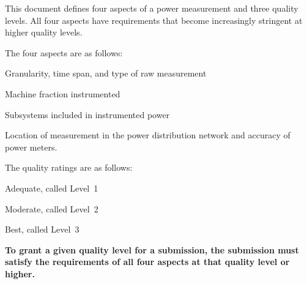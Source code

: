 This document defines four aspects of a power measurement and three quality levels.
All four aspects have requirements that become increasingly stringent at higher quality levels. 

The four aspects are as follows:

\begin{packed_enum}
\item 
Granularity, time span, and type of raw measurement
\item 
Machine fraction instrumented
\item 
Subsystems included in instrumented power
\item 
Location of measurement in the power distribution network and accuracy of power meters.
\end{packed_enum}


The quality ratings are as follows:

\begin{packed_item}
\item 
Adequate, called Level~1
\item
Moderate, called Level~2
\item
Best, called Level~3
\end{packed_item}

\textbf{To grant a given quality level for a submission, the submission must satisfy the requirements of all four aspects at that quality level or higher.}
